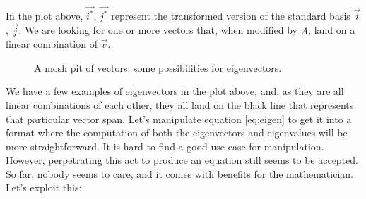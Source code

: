 \documentclass[600paper, 11pt,twoside,openany]{kdp}
\begin{document}
\indent In the plot above, $\overrightarrow{i^*}$, $\overrightarrow{j^*}$ represent the transformed version of the standard basis $\overrightarrow{i}$, $\overrightarrow{j}$. We are looking for one or more vectors that, when modified by $A$, land on a linear combination of $\overrightarrow{v}$.
\begin{figure}[h!]
\begin{center}
\end{center}
\caption{A mosh pit of vectors: some possibilities for eigenvectors.}
\end{figure}
\newpage
\indent We have a few examples of eigenvectors in the plot above, and, as they are all linear combinations of each other, they all land on the black line that represents that particular vector span. Let’s manipulate equation \ref{eq:eigen} to get it into a format where the computation of both the eigenvectors and eigenvalues will be more straightforward. It is hard to find a good use case for manipulation. However, perpetrating this act to produce an equation still seems to be accepted. So far, nobody seems to care, and it comes with benefits for the mathematician. Let’s exploit this:
\end{document}
